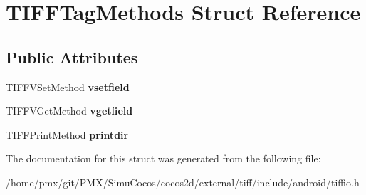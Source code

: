 \hypertarget{structTIFFTagMethods}{}\section{T\+I\+F\+F\+Tag\+Methods Struct Reference}
\label{structTIFFTagMethods}
\subsection*{Public Attributes}
\begin{DoxyCompactItemize}
\item 
\mbox{\label{structTIFFTagMethods_aca00dcd89d84dee403aaf8a7251285e2}} 
T\+I\+F\+F\+V\+Set\+Method {\bfseries vsetfield}
\item 
\mbox{\label{structTIFFTagMethods_a3707570a5c481344ad28313216451766}} 
T\+I\+F\+F\+V\+Get\+Method {\bfseries vgetfield}
\item 
\mbox{\label{structTIFFTagMethods_ae41b0cc9ff7ba54ba2f3b57a77d2bac2}} 
T\+I\+F\+F\+Print\+Method {\bfseries printdir}
\end{DoxyCompactItemize}


The documentation for this struct was generated from the following file\+:\begin{DoxyCompactItemize}
\item 
/home/pmx/git/\+P\+M\+X/\+Simu\+Cocos/cocos2d/external/tiff/include/android/tiffio.\+h\end{DoxyCompactItemize}
